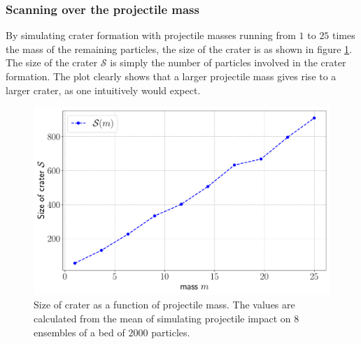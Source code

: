 \subsubsection{Scanning over the projectile mass}

By simulating crater formation with projectile masses running from $1$ to $25$ times the mass of the remaining particles, the size of the crater is as shown in figure \ref{fig:mass_size}. The size of the crater $\mathcal{S}$ is simply the number of particles involved in the crater formation. The plot clearly shows that a larger projectile mass gives rise to a larger crater, as one intuitively would expect. 

\begin{figure}
	\centering
	\includegraphics[width=\columnwidth]{../fig/mass_size}
	\caption{Size of crater as a function of projectile mass. The values are calculated from the mean of simulating projectile impact on $8$ ensembles of a bed of $2000$ particles.}
	\label{fig:mass_size}
\end{figure}